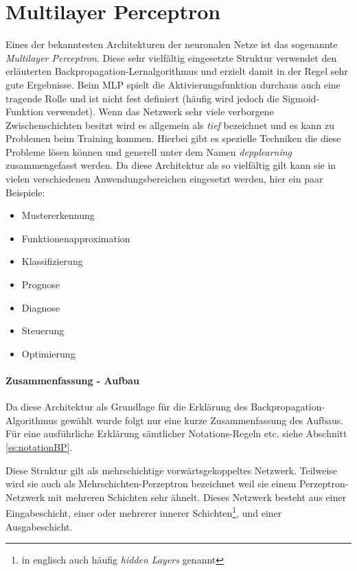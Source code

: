 \section{Multilayer Perceptron}

Eines der bekanntesten Architekturen der neuronalen Netze ist das sogenannte \emph{Multilayer Perceptron}. Diese sehr vielfältig eingesetzte Struktur verwendet den erläuterten Backpropagation-Lernalgorithmus und erzielt damit in der Regel sehr gute Ergebnisse. Beim MLP spielt die Aktivierungsfunktion durchaus auch eine tragende Rolle und ist nicht fest definiert (häufig wird jedoch die Sigmoid-Funktion verwendet). Wenn das Netzwerk sehr viele verborgene Zwischenschichten besitzt wird es allgemein als \emph{tief} bezeichnet und es kann zu Problemen beim Training kommen. Hierbei gibt es spezielle Techniken die diese Probleme lösen können und generell unter dem Namen \emph{depplearning} zusammengefasst werden. Da diese Architektur als so vielfältig gilt kann sie in vielen verschiedenen Anwendungsbereichen eingesetzt werden, hier ein paar Beispiele:

\begin{multicols}{2}
\begin{itemize}
\item Mustererkennung
\item Funktionenapproximation
\item Klassifizierung
\item Prognose
\item Diagnose
\item Steuerung
\item Optimierung
\end{itemize}
\end{multicols}

\paragraph{Zusammenfassung - Aufbau}

Da diese Architektur als Grundlage für die Erklärung des Backpropagation-Algorithmus gewählt wurde folgt nur eine kurze Zusammenfassung des Aufbaus. Für eine ausführliche Erklärung sämtlicher Notations-Regeln etc. siehe Abschnitt \ref{ss:notationBP}.

Diese Struktur gilt als mehrschichtige vorwärtsgekoppeltes Netzwerk. Teilweise wird sie auch als Mehrschichten-Perzeptron bezeichnet weil sie einem Perzeptron-Netzwerk mit mehreren Schichten sehr ähnelt. Dieses Netzwerk besteht aus einer Eingabeschicht, einer oder mehrerer innerer Schichten\footnote{in englisch auch häufig \emph{hidden Layers} genannt}, und einer Ausgabeschicht. 

